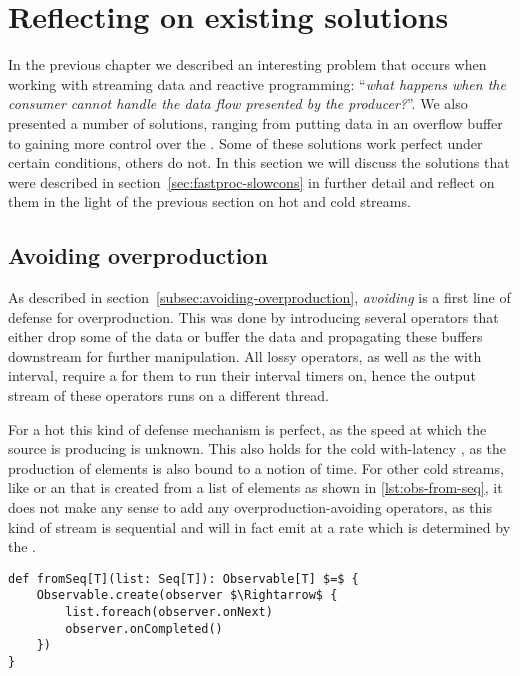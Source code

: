 \section{Reflecting on existing solutions}

In the previous chapter we described an interesting problem that occurs when working with streaming data and reactive programming: ``\textit{what happens when the consumer cannot handle the data flow presented by the producer?}''. We also presented a number of solutions, ranging from putting data in an overflow buffer to gaining more control over the \obs. Some of these solutions work perfect under certain conditions, others do not. In this section we will discuss the solutions that were described in section~\ref{sec:fastproc-slowcons} in further detail and reflect on them in the light of the previous section on hot and cold streams.

\subsection{Avoiding overproduction}
As described in section~\ref{subsec:avoiding-overproduction}, \textit{avoiding} is a first line of defense for overproduction. This was done by introducing several operators that either drop some of the data or buffer the data and propagating these buffers downstream for further manipulation. All lossy operators, as well as the  with interval, require a \sch for them to run their interval timers on, hence the output stream of these operators runs on a different thread.

For a hot \obs this kind of defense mechanism is perfect, as the speed at which the source is producing is unknown. This also holds for the cold with-latency \obs, as the production of elements is also bound to a notion of time. For other cold streams, like  or an \obs that is created from a list of elements as shown in \autoref{lst:obs-from-seq}, it does not make any sense to add any overproduction-avoiding operators, as this kind of stream is sequential and will in fact emit at a rate which is determined by the \obv.

\begin{minipage}{\linewidth}
\begin{lstlisting}[style=ScalaStyle, caption={Observable from \code{Seq[T]}}, label={lst:obs-from-seq}]
def fromSeq[T](list: Seq[T]): Observable[T] $=$ {
    Observable.create(observer $\Rightarrow$ {
        list.foreach(observer.onNext)
        observer.onCompleted()
    })
}
\end{lstlisting}
\end{minipage}

